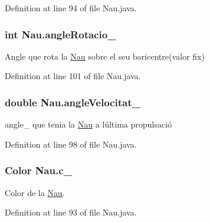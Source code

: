 Definition at line 94 of file Nau.\+java.

\hypertarget{class_nau_a4a3defe435bcea8864ff9025c740695a}{}
\subsubsection[{angle\+Rotacio\+\_\+}]{\setlength{\rightskip}{0pt plus 5cm}int Nau.\+angle\+Rotacio\+\_\+\hspace{0.3cm}{\ttfamily [private]}}\label{class_nau_a4a3defe435bcea8864ff9025c740695a}


Angle que rota la \hyperlink{class_nau}{Nau} sobre el seu baricentre(valor fix) 



Definition at line 101 of file Nau.\+java.

\hypertarget{class_nau_aa2ee3693a5f2a95449e0310f34d9fad4}{}
\subsubsection[{angle\+Velocitat\+\_\+}]{\setlength{\rightskip}{0pt plus 5cm}double Nau.\+angle\+Velocitat\+\_\+\hspace{0.3cm}{\ttfamily [protected]}}\label{class_nau_aa2ee3693a5f2a95449e0310f34d9fad4}


angle\+\_\+ que tenia la \hyperlink{class_nau}{Nau} a l\textquotesingle{}última propulsació 



Definition at line 98 of file Nau.\+java.

\hypertarget{class_nau_a5447088ba94469c8f4285650b25211fa}{}
\subsubsection[{c\+\_\+}]{\setlength{\rightskip}{0pt plus 5cm}Color Nau.\+c\+\_\+\hspace{0.3cm}{\ttfamily [private]}}\label{class_nau_a5447088ba94469c8f4285650b25211fa}


Color de la \hyperlink{class_nau}{Nau}. 



Definition at line 93 of file Nau.\+java.

\hypertarget{class_nau_a67c5417119c7e520e1876a919119867d}{}
